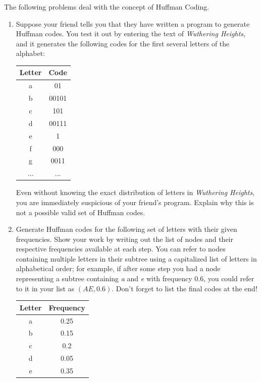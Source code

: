 \documentclass[9pt]{article}
\begin{document}
\item The following problems deal with the concept of Huffman Coding.

\begin{enumerate}

\item Suppose your friend tells you that they have written a program to generate Huffman codes. You test it out by entering the text of \textit{Wuthering Heights}, and it generates the following codes for the first several letters of the alphabet:

\begin{center}
\begin{tabular}{c|c}
Letter & Code \\ \hline
a & 01 \\ 
b & 00101 \\
c & 101 \\
d & 00111 \\
e & 1 \\
f & 000 \\
g & 0011 \\
... & ...
\end{tabular}
\end{center}

Even without knowing the exact distribution of letters in \textit{Wuthering Heights}, you are immediately suspicious of your friend's program. Explain why this is not a possible valid set of Huffman codes.

\item Generate Huffman codes for the following set of letters with their given frequencies. Show your work by writing out the list of nodes and their respective frequencies available at each step. You can refer to nodes containing multiple letters in their subtree using a capitalized list of letters in alphabetical order; for example, if after some step you had a node representing a subtree containing \textit{a} and \textit{e} with frequency 0.6, you could refer to it in your list as $(AE, 0.6)$. Don't forget to list the final codes at the end!

\begin{center}
\begin{tabular}{c|c}
Letter & Frequency \\ \hline
a & 0.25 \\ 
b & 0.15 \\
c & 0.2 \\
d & 0.05 \\
e & 0.35
\end{tabular}
\end{center}


\end{enumerate}
\end{document}
